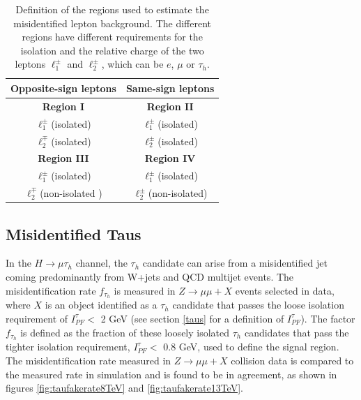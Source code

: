 \documentclass[oneside, letterpaper, oldfontcommands]{memoir}
\begin{document}
\begin{table}[hbt]
 \centering
 
 \renewcommand{\arraystretch}{1.1}
 \caption{Definition of the regions used to estimate the misidentified lepton background. The different regions have different requirements for the
isolation and the relative charge of the two leptons $\ell^{\pm}_{1}$ and $\ell^{\pm}_{2}$, which can be $e$, $\mu$ or $\tau_{h}$.}
  \label{tab:fakeratediagram}
  
  \begin{tabular}{c|c}  
  Opposite-sign leptons & Same-sign leptons \\
  \hline
\textbf{Region I}              &  \textbf{Region II}             \\ \hline
$\ell^{\pm}_{1}$(isolated)  &  $\ell^{\pm}_{1}$(isolated)             \\
$\ell^{\mp}_{2}$(isolated)  &  $\ell^{\pm}_{2}$(isolated)             \\

\hline \hline
\textbf{Region III}           &  \textbf{Region IV}             \\ \hline
$\ell^{\pm}_{1}$(isolated)  &  $\ell^{\pm}_{1}$(isolated)             \\
$\ell^{\mp}_{2}$(non-isolated )  &  $\ell^{\pm}_{2}$(non-isolated)             \\
\hline
  \end{tabular}
  
\end{table}
\subsection{Misidentified Taus}\label{misidtaus}
\qquad In the $H \rightarrow \mu\tau_{h}$ channel, the $\tau_{h}$ candidate can arise from a misidentified jet coming predominantly from W+jets and QCD multijet events. The misidentification rate $f_{\tau_{h}}$ is measured in $Z \rightarrow \mu\mu +X$ events selected in data, where $X$ is an object identified as a $\tau_{h}$ candidate that passes the loose isolation requirement of $I_{PF}^{\tau} <$ 2 GeV (see section \ref{taus} for a definition of $I_{PF}^{\tau}$). The factor $f_{\tau_{h}}$ is defined as the fraction of these loosely isolated $\tau_{h}$ candidates that pass the tighter isolation requirement, $I_{PF}^{\tau} <$ 0.8 GeV, used to define the signal region. The misidentification rate measured in $Z\rightarrow \mu\mu+X$ collision data is compared to the measured rate in simulation and is found to be in agreement, as shown in figures \ref{fig:taufakerate8TeV} and \ref{fig:taufakerate13TeV}.
\end{document}
